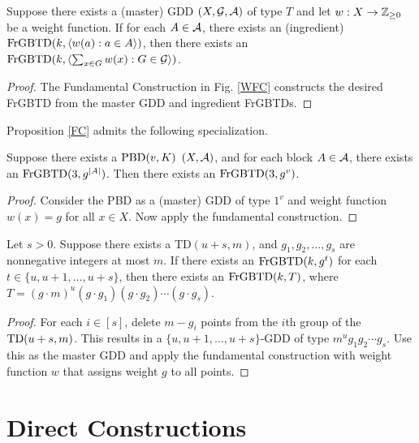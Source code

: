 \documentclass[draft, 11pt]{article}
\begin{document}
 \begin{proposition}
 \label{FC} Suppose there exists a (master) GDD $(X,\mathcal G,\mathcal A)$ of type
 $T$ and let $w:X\to\mathbb Z_{\geq 0}$ be a weight function. If for each
 $A\in\mathcal A$, there exists an (ingredient) ${\rm FrGBTD}(k,\langle
 w(a):a\in A\rangle)$, then there exists an ${\rm FrGBTD}(k,\langle
 \sum_{x\in G} w(x) : G\in\mathcal G\rangle)$.
 \end{proposition}

\begin{proof}
The Fundamental Construction in Fig. \ref{WFC} constructs the desired FrGBTD
from the master GDD and ingredient FrGBTDs.
\end{proof}

Proposition \ref{FC} admits the following specialization.

\begin{proposition}
\label{prop:pbdclosure}
Suppose there exists a ${\rm PBD}(v,K)$ $(X,\mathcal A)$, and for each block $A\in\mathcal A$, there
exists an ${\rm FrGBTD}(3,g^{|A|})$. Then there exists an ${\rm FrGBTD}(3,g^v)$.
\end{proposition}

\begin{proof}
Consider the PBD as a (master) GDD of type $1^v$ and weight function $w(x)=g$ for all
$x\in X$. Now apply the fundamental construction.
\end{proof}
 

\begin{proposition}
\label{prop:truncation} Let $s>0$. 
Suppose there exists a TD$(u+s,m)$,
and $g_1,g_2,\ldots,g_s$ are nonnegative integers at most $m$. 
If there exists an ${\rm FrGBTD}(k,g^t)$ for each $t\in\{u,u+1,\ldots,u+s\}$,
then there exists an ${\rm FrGBTD}(k,T)$, where $T=(g\cdot
m)^u(g\cdot g_1)(g\cdot g_2)\cdots (g\cdot g_s)$.
\end{proposition}

\begin{proof}
For each $i\in[s]$, delete $m-g_i$ points from the $i$th group of the ${\rm TD}(u+s,m)$.
This results in a $\{u,u+1,\ldots,u+s\}$-GDD of type $m^u g_1 g_2 \cdots g_s$. Use this
as the master GDD and apply the fundamental construction with weight function
$w$ that assigns weight $g$ to all points.
\end{proof}

\section{Direct Constructions}
\label{sec:direct}
\end{document}
